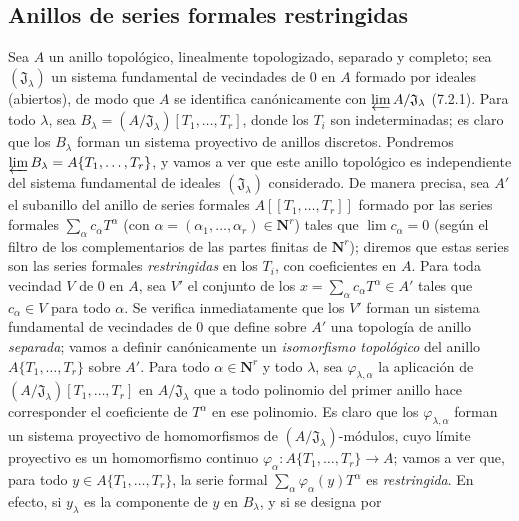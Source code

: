 \subsection{Anillos de series formales restringidas}
\label{subsection:0.7.5-fr}

\begin{env}[7.5.1]
\label{0.7.5.1-fr}
Sea $A$ un anillo topológico, linealmente topologizado, separado y completo;
sea $(\mathfrak J_\lambda)$ un sistema fundamental de vecindades de $0$ en
$A$ formado por ideales (abiertos), de modo que $A$ se identifica canónicamente con
$\varprojlim A/\mathfrak J_\lambda$ (7.2.1). Para todo $\lambda$, sea
$B_\lambda=(A/\mathfrak J_\lambda)[T_1,\ldots,T_r]$, donde los $T_i$ son
indeterminadas; es claro que los $B_\lambda$ forman un sistema proyectivo
de anillos discretos. Pondremos
$\varprojlim B_\lambda=A\{T_1,\ldots,T_r\}$, y vamos a ver que este anillo
topológico es independiente del sistema fundamental de ideales
$(\mathfrak J_\lambda)$ considerado. De manera precisa, sea $A'$ el subanillo
del anillo de series formales $A[\![T_1,\ldots,T_r]\!]$ formado por las series
formales $\sum_\alpha c_\alpha T^\alpha$ (con
$\alpha=(\alpha_1,\ldots,\alpha_r)\in\mathbf{N}^r$) tales que
$\lim c_\alpha=0$ (según el filtro de los complementarios de las partes
finitas de $\mathbf{N}^r$); diremos que estas series son las series
formales \emph{restringidas} en los $T_i$, con coeficientes en $A$.
Para toda vecindad $V$ de $0$ en $A$, sea $V'$ el conjunto de los
$x=\sum_\alpha c_\alpha T^\alpha\in A'$ tales que $c_\alpha\in V$ para todo
$\alpha$. Se verifica inmediatamente que los $V'$ forman un sistema fundamental de
vecindades de $0$ que define sobre $A'$ una topología de anillo \emph{separada};
vamos a definir canónicamente un \emph{isomorfismo topológico} del
anillo $A\{T_1,\ldots,T_r\}$ sobre $A'$. Para todo
$\alpha\in\mathbf{N}^r$ y todo $\lambda$, sea
$\varphi_{\lambda,\alpha}$ la aplicación de
$(A/\mathfrak J_\lambda)[T_1,\ldots,T_r]$ en
$A/\mathfrak J_\lambda$ que a todo polinomio del primer anillo hace
corresponder el coeficiente de $T^\alpha$ en ese polinomio. Es claro que
los $\varphi_{\lambda,\alpha}$ forman un sistema proyectivo de homomorfismos
de $(A/\mathfrak J_\lambda)$-módulos, cuyo límite proyectivo es un
homomorfismo continuo
$\varphi_\alpha:A\{T_1,\ldots,T_r\}\to A$; vamos a ver que, para todo
$y\in A\{T_1,\ldots,T_r\}$, la serie formal
$\sum_\alpha\varphi_\alpha(y)T^\alpha$ es \emph{restringida}. En efecto, si
$y_\lambda$ es la componente de $y$ en $B_\lambda$, y si se designa por

\end{env}
